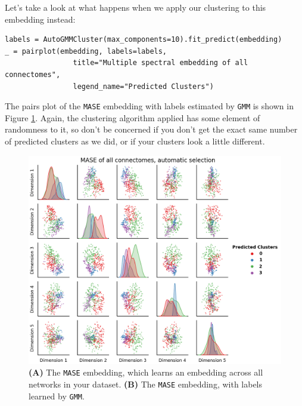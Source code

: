 Let's take a look at what happens when we apply our clustering to this embedding instead:

\begin{lstlisting}[style=python]
labels = AutoGMMCluster(max_components=10).fit_predict(embedding)
_ = pairplot(embedding, labels=labels,
                title="Multiple spectral embedding of all connectomes", 
                legend_name="Predicted Clusters")
\end{lstlisting}
The pairs plot of the \texttt{MASE} embedding with labels estimated by \texttt{GMM} is shown in Figure \ref{fig:ch2:mase}. Again, the clustering algorithm applied has some element of randomness to it, so don't be concerned if you don't get the exact same number of predicted clusters as we did, or if your clusters look a little different.

\begin{figure}[h]
    \centering
    \includegraphics[width=\linewidth]{foundations/ch2/Images/mase.png}
    \caption[Joint embedding with estimated labels for connectomes]{\textbf{(A)} The \texttt{MASE} embedding, which learns an embedding across all networks in your dataset. \textbf{(B)} The \texttt{MASE} embedding, with labels learned by \texttt{GMM}.}
    \label{fig:ch2:mase}
\end{figure}
\newpage